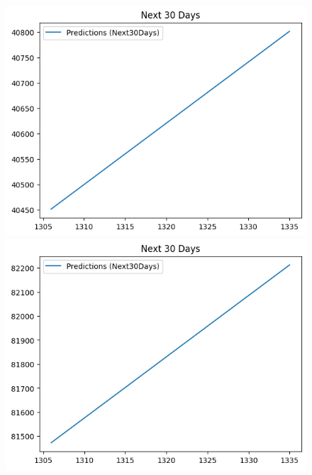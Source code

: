 \begin{figure}[H]
\begin{minipage}{0.15\textwidth}
    \end{minipage}
    \hfill
        \begin{minipage}{0.15\textwidth}
    \centering
    \includegraphics[width=1\textwidth]{resources/chapter-5/newdata/predicted/BIDV_LinearRegression_9-1 30 DAYS.png}
    \end{minipage}
    \hfill
    \begin{minipage}{0.15\textwidth}
    \centering
    \includegraphics[width=1\textwidth]{resources/chapter-5/newdata/predicted/VCB_LinearRegression_7-3 30 DAYS.png}
    \end{minipage}
    \hfill
    \begin{minipage}{0.15\textwidth}

\end{minipage}
\end{figure}
